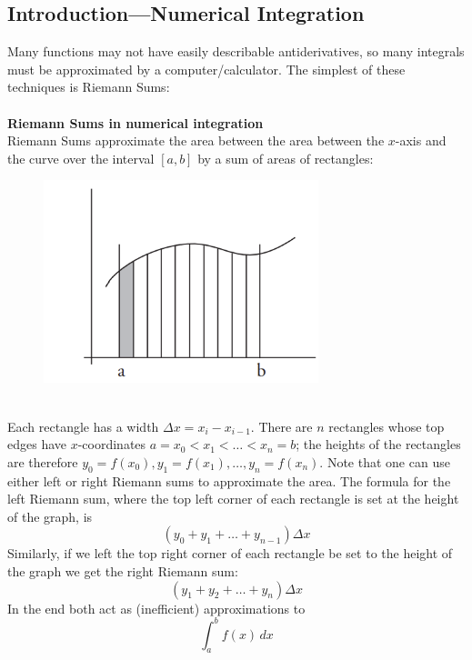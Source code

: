 \documentclass{report}
\begin{document}
\subsection{Introduction---Numerical Integration} %
Many functions may not have easily describable antiderivatives, so many integrals
must be approximated by a computer/calculator. The simplest of these
techniques is Riemann Sums:\\
\vspace{1mm}\\
\textbf{Riemann Sums in numerical integration}\\
Riemann Sums approximate the area between the area between the $x$-axis and the 
curve over the interval $[a,b]$ by a sum of areas of rectangles:
\begin{figure}[h]
\includegraphics[width=8cm]{Capture33}\\
\centering
{}
\end{figure}\\
Each rectangle has a width $\Delta x=x_i-x_{i-1}$. There
are $n$ rectangles whose top edges have $x$-coordinates 
$a=x_0<x_1<\ldots<x_n=b$; the heights of the rectangles are therefore 
$y_0=f(x_0),y_1=f(x_1),\ldots,y_n=f(x_n)$.
Note that one can use either left or right Riemann sums to approximate the area. 
The formula for the left Riemann sum, where the top
left corner of each rectangle is set at the height of the graph, is
\begin{equation*}
(y_0+y_1+\ldots+y_{n-1})\Delta x
\end{equation*}
Similarly, if we left the top right corner of each rectangle be set to the
height of the graph we get the right Riemann sum:
\begin{equation*}
(y_1+y_2+\ldots+y_n)\Delta x
\end{equation*}
In the end both act as (inefficient) approximations to
\begin{equation*}
\int_a^bf(x)\,dx
\end{equation*}
\newpage
\end{document}
